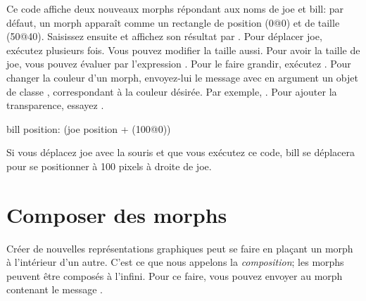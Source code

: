 \documentclass[a4paper,10pt,twoside]{book}
\begin{document}
Ce code affiche deux nouveaux morphs répondant aux noms de joe et
bill: par défaut, un morph apparaît comme  un rectangle de
position (0@0) et de taille (50@40).
Saisissez ensuite  et affichez son résultat par .
Pour déplacer joe, exécutez  plusieurs fois.
Vous pouvez modifier la taille aussi. Pour avoir la taille de joe,
vous pouvez évaluer par  l'expression 
. Pour le faire grandir, exécutez .
Pour changer la couleur d'un morph, envoyez-lui le message
 avec en argument un objet de classe ,
correspondant à la couleur désirée. Par exemple,
.
Pour ajouter la transparence, essayez
.

\begin{code}{}
bill position: (joe position + (100@0))
\end{code}
\noindent

Si vous déplacez joe avec la souris et que vous exécutez ce code,
bill se déplacera pour se positionner à 100 pixels à droite de joe.

\section{Composer des morphs}

Créer de nouvelles représentations graphiques peut se faire en
plaçant un morph à l'intérieur d'un autre. C'est ce que nous
appelons la \emph{composition}; les morphs peuvent être composés
à l'infini. %
Pour ce faire, vous pouvez envoyer au morph contenant le message
. %
%
\end{document}
